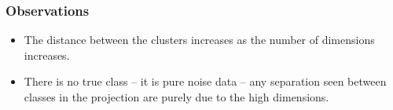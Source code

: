 \documentclass{beamer}
\begin{document}

\begin{frame}
\frametitle{Observations}
\begin{itemize}
\item The distance between the clusters increases as the number of dimensions increases.
\item There is no true class -- it is pure noise data -- any separation seen between classes in the projection are purely due to the high dimensions.
\end{itemize}
\end{frame}


\end{document}
